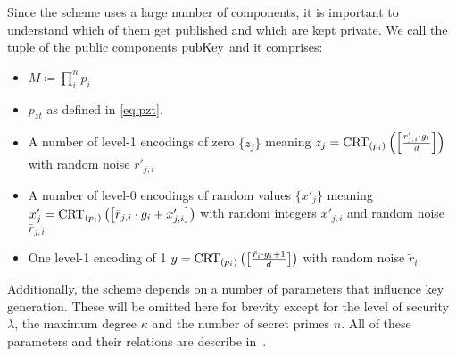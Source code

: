 \documentclass[english]{scrartcl}
\theoremstyle{plain}
\theoremstyle{definition}
\begin{document}
    Since the scheme uses a large number of components, it is important to understand which of them get published and which are kept private. We call the tuple of the public components $\mathrm{pubKey}$ and it comprises:
    \begin{itemize}
        \item $M \coloneqq \prod_i^n p_i$
        \item $p_{zt}$ as defined in \cref{eq:pzt}.
        \item A number of level-1 encodings of zero $\{z_j\}$ meaning $z_j = \operatorname{CRT}_{(p_{i})}\left(\left[\frac{r'_{j,i} \cdot g_i}{d}\right]\right)$ with random noise $r'_{j,i}$
        \item A number of level-0 encodings of random values $\{x'_j\}$ meaning $x'_j = \operatorname{CRT}_{(p_{i})}\left(\left[\bar{r}_{j,i} \cdot g_i + x'_{j,i}\right]\right)$ with random integers $x'_{j,i}$ and random noise $\bar{r}_{j,i}$
        \item One level-1 encoding of 1 $y = \operatorname{CRT}_{(p_{i})}\left(\left[\frac{\tilde{r}_{i} \cdot g_i + 1}{d}\right]\right)$ with random noise $\tilde{r}_{i}$
    \end{itemize}
    Additionally, the scheme depends on a number of parameters that influence key generation. These will be omitted here for brevity except for the level of security $\lambda$, the maximum degree $\kappa$ and the number of secret primes $n$. All of these parameters and their relations are describe in~\cite{cryptoeprint:2013:183}.
\end{document}
